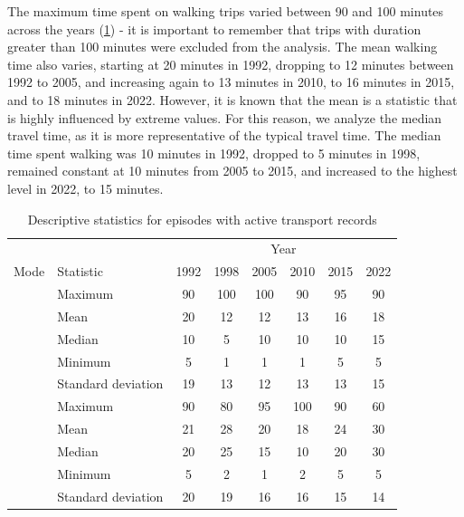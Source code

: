 \documentclass[preprint, 3p,
authoryear]{elsarticle} %
\begin{document}
The maximum time spent on walking trips varied between 90 and 100
minutes across the years (\ref{tab:table-02}) - it is important to
remember that trips with duration greater than 100 minutes were excluded
from the analysis. The mean walking time also varies, starting at 20
minutes in 1992, dropping to 12 minutes between 1992 to 2005, and
increasing again to 13 minutes in 2010, to 16 minutes in 2015, and to 18
minutes in 2022. However, it is known that the mean is a statistic that
is highly influenced by extreme values. For this reason, we analyze the
median travel time, as it is more representative of the typical travel
time. The median time spent walking was 10 minutes in 1992, dropped to 5
minutes in 1998, remained constant at 10 minutes from 2005 to 2015, and
increased to the highest level in 2022, to 15 minutes.

\begingroup\fontsize{8}{10}\selectfont

\begin{longtable}[t]{>{}llcccccc}
\caption{\label{tab:table-02}\label{tab:table-02}Descriptive statistics for episodes with active transport records}\\
\toprule
\multicolumn{2}{c}{ } & \multicolumn{6}{c}{Year} \\
\cmidrule(l{3pt}r{3pt}){3-8}
Mode & Statistic & 1992 & 1998 & 2005 & 2010 & 2015 & 2022\\
\midrule
 & Maximum & 90 & 100 & 100 & 90 & 95 & 90\\
\nopagebreak
 & Mean & 20 & 12 & 12 & 13 & 16 & 18\\
\nopagebreak
 & Median & 10 & 5 & 10 & 10 & 10 & 15\\
\nopagebreak
 & Minimum & 5 & 1 & 1 & 1 & 5 & 5\\
\nopagebreak
\multirow[t]{-5}{*}{\raggedright\arraybackslash \textbf{Walking}} & Standard deviation & 19 & 13 & 12 & 13 & 13 & 15\\
\cmidrule{1-8}\pagebreak[0]
 & Maximum & 90 & 80 & 95 & 100 & 90 & 60\\
\nopagebreak
 & Mean & 21 & 28 & 20 & 18 & 24 & 30\\
\nopagebreak
 & Median & 20 & 25 & 15 & 10 & 20 & 30\\
\nopagebreak
 & Minimum & 5 & 2 & 1 & 2 & 5 & 5\\
\nopagebreak
\multirow[t]{-5}{*}{\raggedright\arraybackslash \textbf{Cycling}} & Standard deviation & 20 & 19 & 16 & 16 & 15 & 14\\
\bottomrule
\end{longtable}
\endgroup{}
\end{document}

